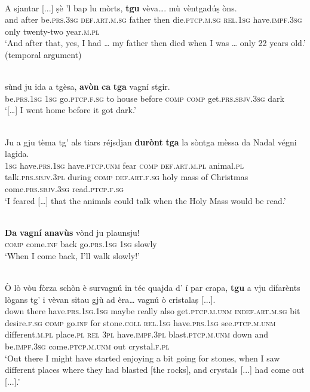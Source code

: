 \ea
\label{}
\\
\gll    A sjantar [...] ṣè 'l bap lu mòrts, \textbf{tgu} vèva…. mù vèntgadúṣ òns.\\
and after {} be.\textsc{prs.3sg} \textsc{def.art.m.sg} father then die.\textsc{ptcp.m.sg} \textsc{rel.1sg} have.\textsc{impf.3sg} only twenty-two year.\textsc{m.pl}\\
\glt `And after that, yes, I had … my father then died when I was … only 22 years old.' (temporal argument)
\z

\ea
\label{}
 {\citealt[17]{Büchli1966}}\\
\gll    sùnd ju ida a tgèsa, \textbf{avòn} \textbf{ca} \textbf{tga} vagní stgir.\\
     be.\textsc{prs.1sg} \textsc{1sg} go.\textsc{ptcp.f.sg} to house before \textsc{comp} \textsc{comp} get.\textsc{prs.sbjv.3sg} dark \\
\glt `[…] I went home before it got dark.'
\z

\ea
\label{}
 {\citealt[19]{Büchli1966}}\\
\gll    Ju a gju tèma tg’ als tiars réjsdjan \textbf{durònt} \textbf{tga} la sòntga mèssa da Nadal végni lagida.\\
      \textsc{1sg} have.\textsc{prs.1sg} have.\textsc{ptcp.unm} fear \textsc{comp} \textsc{def.art.m.pl} animal.\textsc{pl} talk.\textsc{prs.sbjv.3pl} during \textsc{comp} \textsc{def.art.f.sg} holy mass of Christmas come.\textsc{prs.sbjv.3sg} read.\textsc{ptcp.f.sg}\\
\glt `I feared […] that the animals could talk when the Holy Mass would be read.'
\z

\ea
\label{}
\\
\gll    \textbf{Da} \textbf{vagní} \textbf{anavùs} vònd ju plaunsju!\\
    \textsc{comp} come.\textsc{inf} back go.\textsc{prs.1sg} \textsc{1sg} slowly \\
\glt `When I come back, I’ll walk slowly!'
\z

\ea\label{}
\\
\gll  Ò lò vòu fòrza schòn è survagnú in téc quajda d' í par crapa, \textbf{tgu} a vju difarènts lògans tg’ i vèvan sitau gjù ad èra… vagnú ò cristalaṣ [...]. \\
down there  have.\textsc{prs.1sg.1sg} maybe really also get.\textsc{ptcp.m.unm} \textsc{indef.art.m.sg} bit desire.\textsc{f.sg} \textsc{comp} go.\textsc{inf} for stone.\textsc{coll} \textsc{rel.1sg} have.\textsc{prs.1sg} see.\textsc{ptcp.m.unm} different.\textsc{m.pl} place.\textsc{pl} \textsc{rel} \textsc{3pl} have.\textsc{impf.3pl} blast.\textsc{ptcp.m.unm} down and  be.\textsc{impf.3sg} come.\textsc{ptcp.m.unm} out crystal.\textsc{f.pl}\\
\glt `Out there I might have started enjoying a bit going for stones, when I saw different places where they had blasted [the rocks], and crystals [...] had come out [...].'
\z


